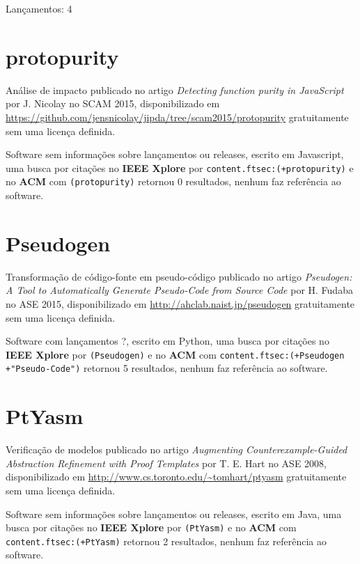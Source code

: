 Lançamentos: 4

\section{protopurity}

Análise de impacto
publicado no artigo {\it Detecting function purity in JavaScript}
por J. Nicolay
no SCAM 2015,
disponibilizado em \url{https://github.com/jensnicolay/jipda/tree/scam2015/protopurity}
gratuitamente
sem uma licença definida.

Software sem informações sobre lançamentos ou releases,
escrito em Javascript,
uma busca por citações no {\bf IEEE Xplore} por
\texttt{content.ftsec:(+protopurity)}
e no {\bf ACM} com
\texttt{(protopurity)}
retornou
0 resultados,
nenhum faz referência ao software.



\section{Pseudogen}

Transformação de código-fonte em pseudo-código
publicado no artigo {\it Pseudogen: A Tool to Automatically Generate Pseudo-Code from Source Code}
por H. Fudaba
no ASE 2015,
disponibilizado em \url{http://ahclab.naist.jp/pseudogen}
gratuitamente
sem uma licença definida.

Software com lançamentos ?,
escrito em Python,
uma busca por citações no {\bf IEEE Xplore} por
\texttt{(Pseudogen)}
e no {\bf ACM} com
\texttt{content.ftsec:(+Pseudogen +"Pseudo-Code")}
retornou
5 resultados,
nenhum faz referência ao software.



\section{PtYasm}

Verificação de modelos
publicado no artigo {\it Augmenting Counterexample-Guided Abstraction Refinement with Proof Templates}
por T. E. Hart
no ASE 2008,
disponibilizado em \url{http://www.cs.toronto.edu/~tomhart/ptyasm}
gratuitamente
sem uma licença definida.

Software sem informações sobre lançamentos ou releases,
escrito em Java,
uma busca por citações no {\bf IEEE Xplore} por
\texttt{(PtYasm)}
e no {\bf ACM} com
\texttt{content.ftsec:(+PtYasm)}
retornou
2 resultados,
nenhum faz referência ao software.



